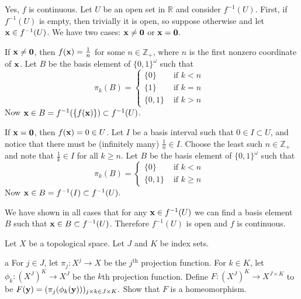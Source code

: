 \documentclass[11pt]{article}
\begin{document}
\begin{solution}
  Yes, $f$ is continuous. Let $U$ be an open set in $\mathbb{R}$ and consider
  $f^{-1}(U)$. First, if $f^{-1}(U)$ is empty, then trivially it is open, so
  suppose otherwise and let $\vb x \in f^{-1}(U)$. We have two cases: $\vb x
  \neq \vb 0$ or $\vb x = \vb 0.$

  If $\vb x \neq \vb 0$, then $f(\vb x) = \frac{1}{n}$ for some $n \in
  \mathbb{Z}_+$, where $n$ is the first nonzero coordinate of $\vb x$. Let $B$
  be the basis element of $\{0, 1\}^\omega$ such that
  \[ \pi_k(B) = \begin{cases}
      \{0\} &\text{ if $k < n$ } \\
      \{1\} &\text{ if $k = n$ } \\
      \{0, 1\} &\text{ if $k > n$ }
  \end{cases} \]
  Now $\vb x \in B = f^{-1}(\{f(\vb x)\}) \subset f^{-1}(U)$.

  If $\vb x = \vb 0$, then $f(\vb x) = 0 \in U$. Let $I$ be a basis interval
  such that $0 \in I \subset U$, and notice that there must be (infinitely many)
  $\frac{1}{n} \in I$. Choose the least such $n \in \mathbb{Z}_+$ and note that
  $\frac{1}{k} \in I$ for all $k \geq n$. Let $B$ be the basis element of $\{0,
  1\}^\omega$ such that
  \[ \pi_k(B) = \begin{cases}
      \{0\} &\text{ if $k < n$ } \\
      \{0, 1\} &\text{ if $k \geq n$ }
  \end{cases} \]
  Now $\vb x \in B = f^{-1}(I) \subset f^{-1}(U)$.

  We have shown in all cases that for any $\vb x \in f^{-1}(U)$ we can find a
  basis element $B$ such that $\vb x \in B \subset f^{-1}(U)$. Therefore $f^{-1}(U)$
  is open and $f$ is continuous.
\end{solution}


\noindent Let $X$ be a topological space. Let $J$ and $K$ be index sets.

\begin{p}{a}
  For $j \in J$, let $\pi_j: X^j \to X$ be the $j^\text{th}$ projection
  function. For $k \in K$, let $\phi_k: (X^J)^K \to X^J$ be the $k$th projection
  function. Define $F: (X^J)^K \to X^{J \times K}$ to be $F(\vb y) =
  (\pi_j(\phi_k(\vb y)))_{j \times k \in J \times K}.$ Show that $F$ is a
  homeomorphism.
\end{p}
\end{document}
